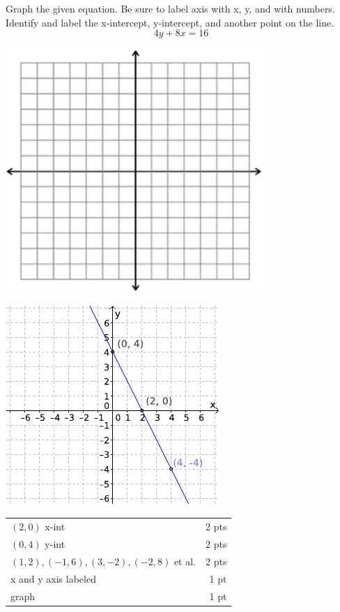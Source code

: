 {
	Graph the given equation. Be sure to label axis with x, y, and with numbers. Identify and label the x-intercept, y-intercept, and another point on the line.
	$$4y+8x=16$$
	\begin{onlyproblem}\begin{center}\includegraphics{fig-graphpaper.png}\end{center}\end{onlyproblem}
	\begin{onlysolution}\begin{center}\includegraphics{fig095-09-a-answer}\end{center}\end{onlysolution}
}
{
	\begin{tabular}{l r}
	$(2,0)$ x-int & 2 pts\\
	$(0,4)$ y-int & 2 pts\\
	$(1,2),(-1,6),(3,-2),(-2,8)$ et al. & 2 pts\\
	x and y axis labeled & 1 pt\\
	graph & 1 pt\\
	\end{tabular}
}

